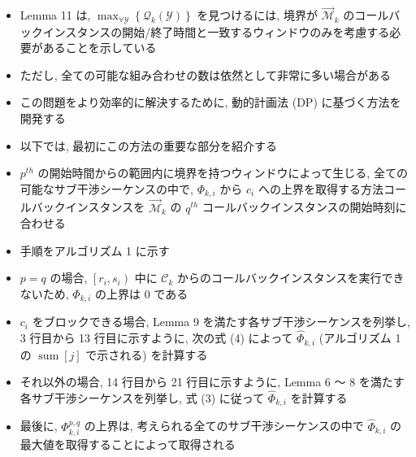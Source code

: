 \begin{frame}{}
    \begin{itemize}
        \item Lemma 11 は, $\max _{\forall \mathcal{Y}}\left\{\mathcal{Q}_{k}(\mathcal{Y})\right\}$ を見つけるには, 境界が $\overrightarrow{\mathcal{M}}_{k}$ のコールバックインスタンスの開始/終了時間と一致するウィンドウのみを考慮する必要があることを示している
        \item ただし, 全ての可能な組み合わせの数は依然として非常に多い場合がある
        \item この問題をより効率的に解決するために, 動的計画法 (DP) に基づく方法を開発する
    \end{itemize}
\end{frame}

\begin{frame}{}
    \begin{itemize}
        \item 以下では, 最初にこの方法の重要な部分を紹介する
        \item $p^{t h}$ の開始時間からの範囲内に境界を持つウィンドウによって生じる, 全ての可能なサブ干渉シーケンスの中で, $\Phi_{k, i}$ から $c_{i}$ への上界を取得する方法コールバックインスタンスを $\overrightarrow{\mathcal{M}}_{k}$ の $q^{t h}$ コールバックインスタンスの開始時刻に合わせる
    \end{itemize}
\end{frame}

\begin{frame}{}
    \begin{itemize}
        \item 手順をアルゴリズム 1 に示す
        \item $p=q$ の場合, $\left[r_{i}, s_{i}\right)$ 中に $\mathcal{C}_{k}$ からのコールバックインスタンスを実行できないため, $\Phi_{k, i}$ の上界は 0 である
        \item $c_{i}$ をブロックできる場合, Lemma 9 を満たす各サブ干渉シーケンスを列挙し, 3 行目から 13 行目に示すように, 次の式 (4) によって $\hat{\Phi}_{k, i}$ (アルゴリズム 1 の $\operatorname{sum}[j]$ で示される) を計算する
        \item それ以外の場合, 14 行目から 21 行目に示すように, Lemma 6 ～ 8 を満たす各サブ干渉シーケンスを列挙し, 式 (3) に従って $\hat{\Phi}_{k, i}$ を計算する
        \item 最後に, $\Phi_{k, i}^{p, q}$ の上界は, 考えられる全てのサブ干渉シーケンスの中で $\hat{\Phi}_{k, i}$ の最大値を取得することによって取得される
    \end{itemize}
\end{frame}

